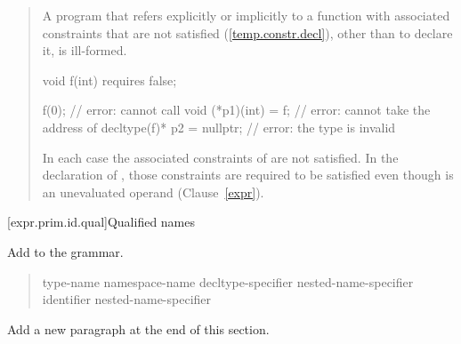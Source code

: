 \begin{quote}
\begin{addedblock}
\pnum
A program that refers explicitly or implicitly to a function with associated 
constraints that are not satisfied (\ref{temp.constr.decl}), other than to 
declare it, is ill-formed.
% 
\enterexample
\begin{codeblock}
void f(int) requires false;

f(0);                      // error: cannot call 
void (*p1)(int) = f;       // error: cannot take the address of 
decltype(f)* p2 = nullptr; // error: the type  is invalid
\end{codeblock}
In each case the associated constraints of  are not satisfied. In the 
declaration of , those constraints are required to be satisfied even 
though  is an unevaluated operand (Clause~\ref{expr}).
\exitexample
\end{addedblock}
\end{quote}


\setcounter{subsubsection}{1}
[expr.prim.id.qual]{Qualified names}

Add  to the  grammar.

\begin{quote}
\begin{bnf}
\br
    \terminal{::}\br
    type-name \terminal{::}\br
    namespace-name \terminal{::}\br
    decltype-specifier \terminal{::}\br
    \br
    nested-name-specifier identifier \terminal{::}\br
    nested-name-specifier \opt \terminal{::}
\end{bnf}
\end{quote}

Add a new paragraph at the end of this section.

